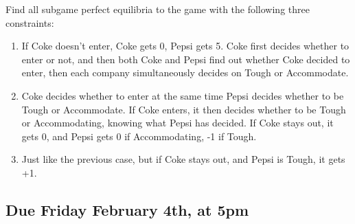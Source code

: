 \documentclass[
  11pt,
]{article}
\providecommand{\tightlist}{%
  \setlength{\itemsep}{0pt}\setlength{\parskip}{0pt}}
\begin{document}
Find all subgame perfect equilibria to the game with the following three
constraints:

\begin{enumerate}
\def\labelenumi{\arabic{enumi}.}
\tightlist
\item
  If Coke doesn't enter, Coke gets 0, Pepsi gets 5. Coke first decides
  whether to enter or not, and then both Coke and Pepsi find out whether
  Coke decided to enter, then each company simultaneously decides on
  Tough or Accommodate.
\item
  Coke decides whether to enter at the same time Pepsi decides whether
  to be Tough or Accommodate. If Coke enters, it then decides whether to
  be Tough or Accommodating, knowing what Pepsi has decided. If Coke
  stays out, it gets 0, and Pepsi gets 0 if Accommodating, -1 if Tough.
\item
  Just like the previous case, but if Coke stays out, and Pepsi is
  Tough, it gets +1.
\end{enumerate}

\hypertarget{due-friday-february-4th-at-5pm}{%
\subsection{Due Friday February 4th, at
5pm}\label{due-friday-february-4th-at-5pm}}
\end{document}
